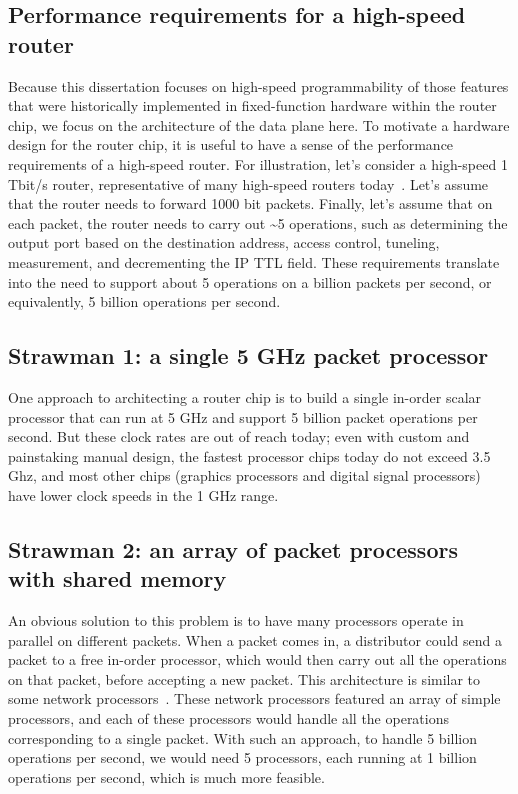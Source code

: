 \subsection{Performance requirements for a high-speed router}
Because this dissertation focuses on high-speed programmability of those
features that were historically implemented in fixed-function hardware within
the router chip, we focus on the architecture of the data plane here. To
motivate a hardware design for the router chip, it is useful to have a sense of
the performance requirements of a high-speed router. For illustration, let's
consider a high-speed 1 Tbit/s router, representative of many high-speed
routers today~\cite{trident2, tomahawk, tomahawk2}. Let's assume that the
router needs to forward 1000 bit packets. Finally, let's assume that on each
packet, the router needs to carry out \textasciitilde5 operations, such as
determining the output port based on the destination address, access control,
tuneling, measurement, and decrementing the IP TTL field. These requirements
translate into the need to support about 5 operations on a billion packets per
second, or equivalently, 5 billion operations per second.

\subsection{Strawman 1: a single 5 GHz packet processor}
One approach to architecting a router chip is to build a single in-order scalar
processor that can run at 5 GHz and support 5 billion packet operations per
second. But these clock rates are out of reach today; even with custom and
painstaking manual design, the fastest processor chips today do not exceed 3.5
Ghz, and most other chips (\eg graphics processors and digital signal
processors) have lower clock speeds in the 1 GHz range.

\subsection{Strawman 2: an array of packet processors with shared memory}

An obvious solution to this problem is to have many processors operate in
parallel on different packets. When a packet comes in, a distributor could send
a packet to a free in-order processor, which would then carry out all the
operations on that packet, before accepting a new packet. This architecture is
similar to some network processors~\cite{ixp1200, ixp2400, quantumflow}.  These
network processors featured an array of simple processors, and each of these
processors would handle all the operations corresponding to a single packet.
With such an approach, to handle 5 billion operations per second, we would need
5 processors, each running at 1 billion operations per second, which is much
more feasible.

